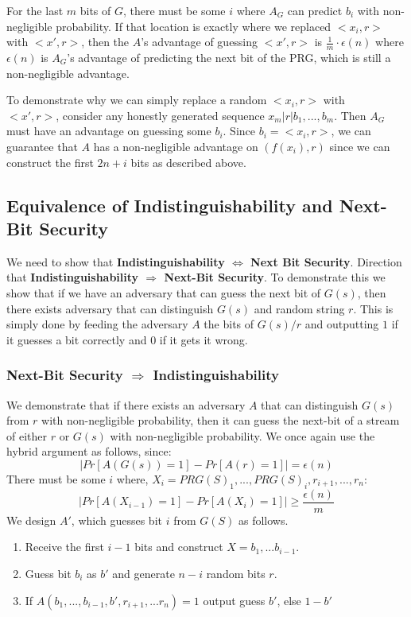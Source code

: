 \documentclass[11pt]{article}
\begin{document}
For the last $m$ bits of $G$, there must be some $i$ where $A_G$ can predict $b_i$ with non-negligible probability. If that location is exactly where we replaced $<x_i,r>$ with $<x',r>$, then the $A$'s advantage of guessing $<x',r>$ is $\frac{1}{m} \cdot \epsilon(n)$ where $\epsilon(n)$ is $A_G$'s advantage of predicting the next bit of the PRG, which is still a non-negligible advantage.
\vspace{1em}

To demonstrate why we can simply replace a random $<x_i,r>$ with\\$<x',r>$, consider any honestly generated sequence $x_m|r|b_1,...,b_m$. Then $A_G$ must have an advantage on guessing some $b_i$. Since $b_i = <x_i, r>$, we can guarantee that $A$ has a non-negligible advantage on $(f(x_i),r)$ since we can construct the first $2n + i$ bits as described above.
\vspace{1em}

\subsection{Equivalence of Indistinguishability and Next-Bit Security}
We need to show that \textbf{Indistinguishability $\Longleftrightarrow$ Next Bit Security}. Direction that \textbf{Indistinguishability $\Longrightarrow$ Next-Bit Security}. To demonstrate this we show that if we have an adversary that can guess the next bit of $G(s)$, then there exists adversary that can distinguish $G(s)$ and random string $r$. This is simply done by feeding the adversary $A$ the bits of $G(s)/r$ and outputting $1$ if it guesses a bit correctly and $0$ if it gets it wrong.

\subsubsection{Next-Bit Security $\Longrightarrow$ Indistinguishability}
We demonstrate that if there exists an adversary $A$ that can distinguish $G(s)$ from $r$ with non-negligible probability, then it can guess the next-bit of a stream of either $r$ or $G(s)$ with non-negligible probability. We once again use the hybrid argument as follows, since:
$$|Pr[A(G(s))=1] - Pr[A(r)=1]| = \epsilon(n)$$
There must be some $i$ where, $X_i=PRG(S)_1,...,PRG(S)_i,r_{i+1},...,r_n$:
$$|Pr[A(X_{i-1})=1]-Pr[A(X_{i})=1]| \geq \frac{\epsilon(n)}{m}$$
We design $A'$, which guesses bit $i$ from $G(S)$ as follows.
\begin{enumerate}
    \item Receive the first $i-1$ bits and construct $X=b_1,...b_{i-1}$.
    \item Guess bit $b_{i}$ as $b'$ and generate $n-i$ random bits $r$.
    \item If $A(b_1,...,b_{i-1},b',r_{i+1},...r_n)=1$ output guess $b'$, else $1-b'$
\end{enumerate}
\vspace{1em}
\end{document}
